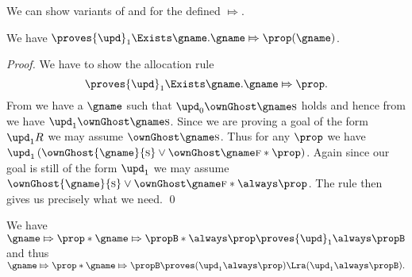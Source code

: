 We can show variants of  and  for the defined $\Mapsto$.
\begin{lem}
  \label{lem:counterexample-invariants-saved-prop-alloc}
We have
  \(\proves {\upd}_1 \Exists \gname. \gname \Mapsto \prop(\gname)\).
\end{lem}
\begin{proof}
  We have to show the allocation rule \[\proves {\upd}_1 \Exists \gname. \gname \Mapsto \prop.\]
    From  we have a $\gname$ such that ${\upd}_0 \ownGhost \gname \starttoken$ holds and hence from  we have ${\upd}_1\ownGhost\gname \starttoken$.
    Since we are proving a goal of the form ${\upd}_1 R$ we may assume $\ownGhost \gname \starttoken$.
    Thus for any $\prop$ we have ${\upd}_1\left(\ownGhost{\gname}{\starttoken} \lor \ownGhost \gname \finishtoken * \prop\right)$.
    Again since our goal is still of the form ${\upd}_1$ we may assume $\ownGhost{\gname}{\starttoken} \lor \ownGhost \gname \finishtoken * \always \prop$.
    The rule  then gives us precisely what we need.
 \qed \end{proof}

%
\begin{lem}
\label{lem:counterexample-invariants-saved-prop-agree}
We have
  \(
  \gname \Mapsto \prop * \gname \Mapsto \propB * \always \prop \proves {\upd}_1 \always \propB
  \)
and thus
  \(
  \gname \Mapsto \prop * \gname \Mapsto \propB \proves ({\upd}_1 \always \prop) \Lra ({\upd}_1 \always \propB).
  \)
\end{lem}

